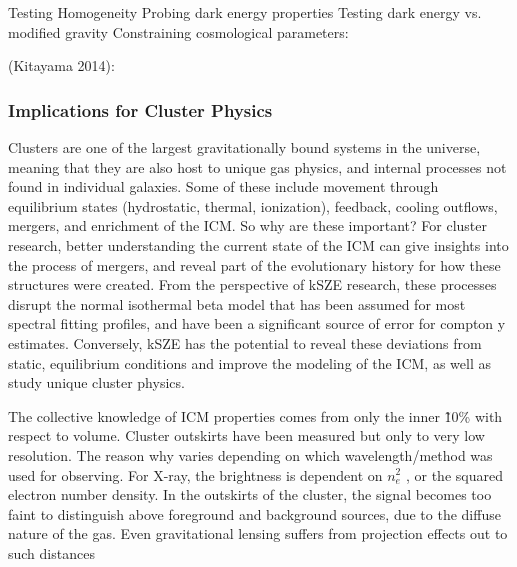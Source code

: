 \documentclass[manuscript]{aastex}
\begin{document}


Testing Homogeneity
Probing dark energy properties
Testing dark energy vs. modified gravity
 Constraining cosmological parameters:

(Kitayama 2014):
	
\subsubsection{Implications for Cluster Physics}

Clusters are one of the largest gravitationally bound systems in the universe, meaning that they are also host to unique gas physics, and internal processes not found in individual galaxies. Some of these include movement through equilibrium states (hydrostatic, thermal, ionization), feedback, cooling outflows, mergers, and enrichment of the ICM. So why are these important? For cluster research, better understanding the current state of the ICM can give insights into the process of mergers, and reveal part of the evolutionary history for how these structures were created. From the perspective of kSZE research, these processes disrupt the normal isothermal beta model that has been assumed for most spectral fitting profiles, and have been a significant source of error for compton y estimates. Conversely, kSZE has the potential to reveal these deviations from static, equilibrium conditions and improve the modeling of the ICM, as well as study unique cluster physics. 

The collective knowledge of ICM properties comes from only the inner \~10\% with respect to volume. Cluster outskirts have been measured but only to very low resolution. The reason why varies depending on which wavelength/method was used for observing. For X-ray, the brightness is dependent on \(n_{e}^{2}\) , or the squared electron number density. In the outskirts of the cluster, the signal becomes too faint to distinguish above foreground and background sources, due to the diffuse nature of the gas. Even gravitational lensing suffers from projection effects out to such distances 
\end{document}
